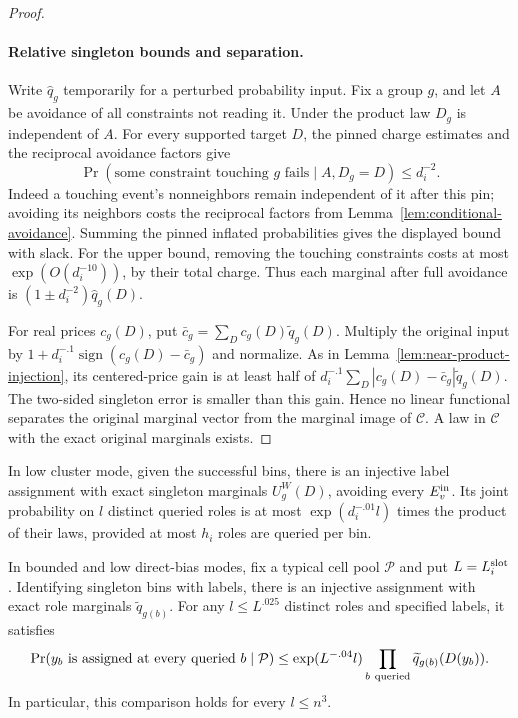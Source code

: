 \begin{proof}
\paragraph{Relative singleton bounds and separation.}
Write \(\widehat q_g\) temporarily for a perturbed probability input.
Fix a group \(g\), and let \(A\) be avoidance of all constraints not
reading it. Under the product law \(D_g\) is independent of \(A\).
For every supported target \(D\), the pinned charge estimates and the
reciprocal avoidance factors give
\[
 \Pr(\text{some constraint touching }g\text{ fails}\mid A,D_g=D)
       \le d_i^{-2}.
\]
Indeed a touching event's nonneighbors remain independent of it after
this pin; avoiding its neighbors costs the reciprocal factors from
Lemma~\ref{lem:conditional-avoidance}. Summing the pinned inflated
probabilities gives the displayed bound with slack. For the upper bound,
removing the touching constraints costs at most \(\exp(O(d_i^{-10}))\),
by their total charge. Thus each marginal after full avoidance is
\((1\pm d_i^{-2})\widehat q_g(D)\).

For real prices \(c_g(D)\), put
\(\bar c_g=\sum_D c_g(D)\widetilde q_g(D)\). Multiply the original
input by
\(1+d_i^{-.1}\operatorname{sign}(c_g(D)-\bar c_g)\) and normalize.
As in Lemma~\ref{lem:near-product-injection}, its centered-price gain
is at least half of
\(d_i^{-.1}\sum_D|c_g(D)-\bar c_g|\widetilde q_g(D)\).
The two-sided singleton error is smaller than this gain. Hence no linear
functional separates the original marginal vector from the marginal
image of \(\mathcal C\). A law in \(\mathcal C\) with the exact
original marginals exists.
\end{proof}

\begin{proposition}\label{prop:calibrated-role-labels}
In low cluster mode, given the successful bins, there is an injective
label assignment with exact singleton marginals \(U_g^W(D)\), avoiding
every \(E_v^{\rm in}\). Its joint probability on \(l\) distinct queried
roles is at most \(\exp(d_i^{-.01}l)\) times the product of their laws,
provided at most \(h_i\) roles are queried per bin.

In bounded and low direct-bias modes, fix a typical cell pool
\(\mathcal P\) and put \(L=L_i^{\rm slot}\). Identifying singleton bins
with labels, there is an injective assignment with exact role marginals
\(\widetilde q_{g(b)}\). For any \(l\le L^{.025}\) distinct roles and
specified labels, it satisfies
\[
 \Pr(y_b\text{ is assigned at every queried }b\mid\mathcal P)
 \le \exp(L^{-.04}l)
          \prod_{b\ {\rm queried}}\widetilde q_{g(b)}(D(y_b)).
\]
In particular, this comparison holds for every \(l\le n^3\).
\end{proposition}

